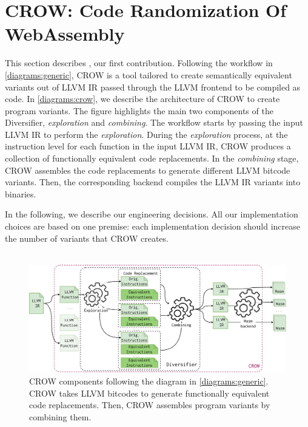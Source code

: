 
\section{CROW: Code Randomization Of WebAssembly}
\label{section:crow}


This section describes \cite{CROW}, our first contribution. Following the workflow in \autoref{diagrams:generic}, CROW is a tool tailored to create semantically equivalent \wasm variants out of LLVM IR passed through the LLVM frontend to be compiled as \wasm code.
In \autoref{diagrams:crow}, we describe the architecture of CROW to create program variants.
The figure highlights the main two components of the Diversifier, \textit{exploration} and \textit{combining}. The workflow starts by passing the input LLVM IR to perform the \emph{exploration}. During the \emph{exploration} process, at the instruction level for each function in the input LLVM IR, CROW produces a collection of functionally equivalent code replacements.  
In the \emph{combining} stage, CROW assembles the code replacements to generate different LLVM bitcode variants. 
Then, the corresponding backend compiles the LLVM IR variants into \wasm binaries.

In the following, we describe our engineering decisions. All our implementation choices are based on one premise: each implementation decision should increase the number of \wasm variants that CROW creates.
\\
\\

\begin{figure}[h]
    \includegraphics[width=\linewidth]{diagrams/generation/crow.drawio.pdf}
    \caption{CROW components following the diagram in \autoref{diagrams:generic}. CROW takes LLVM bitcodes to generate functionally equivalent code replacements. Then, CROW assembles program variants by combining them.}
    \label{diagrams:crow}
\end{figure}


